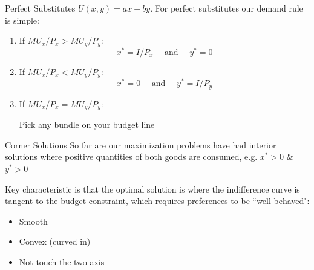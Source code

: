 \documentclass{beamer}
\begin{document}
\begin{frame}{Perfect Substitutes}
  $U(x,y) = ax + by$. For perfect substitutes our demand rule is simple: 
  
  \bigskip
  \begin{enumerate}
    \item If $MU_x/P_x > MU_y / P_y$: 
    $$
      x^* = I / P_x \quad\text{ and }\quad y^* = 0
    $$

    \item If $MU_x/P_x < MU_y / P_y$: 
    $$
      x^* = 0 \quad\text{ and }\quad y^* = I / P_y
    $$
    
    \item If $MU_x/P_x = MU_y / P_y$: 
    
    \begin{center}
      Pick any bundle on your budget line 
    \end{center}
  \end{enumerate}
\end{frame}

\begin{frame}{Corner Solutions}
  So far are our maximization problems have had interior solutions where positive quantities of both goods are consumed, e.g. $x^{*}>0$ \& $y^{*}>0$
  
  \bigskip
  Key characteristic is that the optimal solution is where the indifference curve is tangent to the budget constraint, which requires preferences to be ``well-behaved":
  \begin{itemize}
    \item Smooth

    \item Convex (curved in)
    
    \item Not touch the two axis
  \end{itemize} 
\end{frame}
\end{document}
